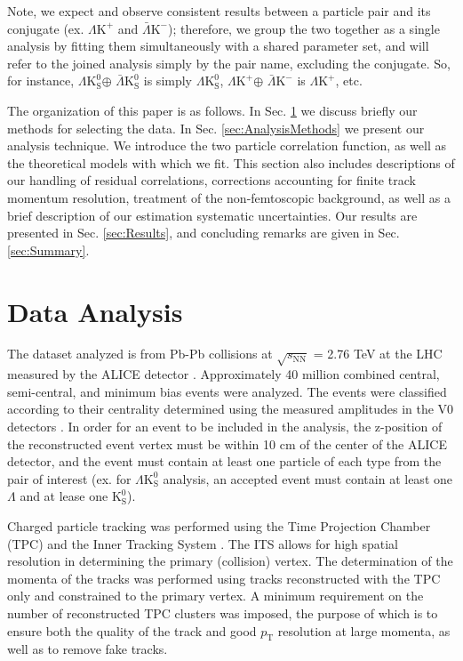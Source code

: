 \documentclass[ALICE,manyauthors]{cernphprep}
\newcommand{\pt}{$p_{\mathrm{T}}$\xspace}
\newcommand{\Lam}{$\Lambda$\xspace}
\newcommand{\Ks}{$\mathrm{K^{0}_{S}}$\xspace}
\newcommand{\LamKchP}{$\Lambda\mathrm{K^{+}}$\xspace}
\newcommand{\ALamKchM}{$\bar{\Lambda}\mathrm{K^{-}}$\xspace}
\newcommand{\LamKs}{$\Lambda\mathrm{K^{0}_{S}}$\xspace}
\newcommand{\ALamKs}{$\bar{\Lambda}\mathrm{K^{0}_{S}}$\xspace}
\begin{document}
Note, we expect and observe consistent results between a particle pair and its conjugate (ex. \LamKchP and \ALamKchM); therefore, we group the two together as a single analysis by fitting them simultaneously with a shared parameter set, and will refer to the joined analysis simply by the pair name, excluding the conjugate.  
So, for instance, \LamKs $\oplus$ \ALamKs is simply \LamKs, \LamKchP $\oplus$ \ALamKchM is \LamKchP, etc.  

The organization of this paper is as follows.  In Sec. \ref{sec:DataAnalysis} we discuss briefly our methods for selecting the data.  
In Sec. \ref{sec:AnalysisMethods} we present our analysis technique.  
We introduce the two particle correlation function, as well as the theoretical models with which we fit.  
This section also includes descriptions of our handling of residual correlations, corrections accounting for finite track momentum resolution, treatment of the non-femtoscopic background, as well as a brief description of our estimation systematic uncertainties.  
Our results are presented in Sec. \ref{sec:Results}, and concluding remarks are given in Sec. \ref{sec:Summary}.

\section{Data Analysis}
\label{sec:DataAnalysis}

The dataset analyzed is from Pb-Pb collisions at $\sqrt{s_{\mathrm{NN}}}$ = 2.76 TeV at the LHC measured by the ALICE detector \cite{1748-0221-3-08-S08002}.
Approximately 40 million combined central, semi-central, and minimum bias events were analyzed.
The events were classified according to their centrality determined using the measured amplitudes in the V0 detectors \cite{Abelev:2013qoq}.  
In order for an event to be included in the analysis, the z-position of the reconstructed event vertex must be within 10 cm of the center of the ALICE detector, and the event must contain at least one particle of each type from the pair of interest (ex. for \LamKs analysis, an accepted event must contain at least one \Lam and at lease one \Ks). 

Charged particle tracking was performed using the Time Projection Chamber (TPC) \cite{2010NIMPA.622..316A} and the Inner Tracking System \cite{1748-0221-3-08-S08002}.  
The ITS allows for high spatial resolution in determining the primary (collision) vertex.
The determination of the momenta of the tracks was performed using tracks reconstructed with the TPC only and constrained to the primary vertex.
A minimum requirement on the number of reconstructed TPC clusters was imposed, the purpose of which is to ensure both the quality of the track and good \pt resolution at large momenta, as well as to remove fake tracks.
\end{document}
